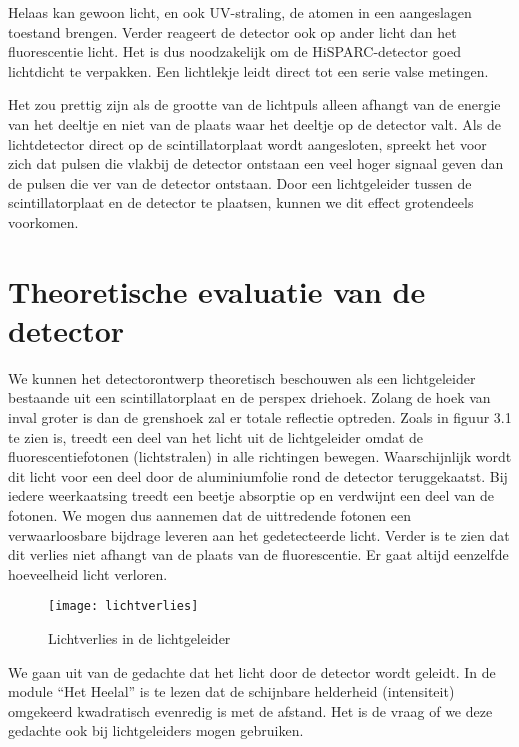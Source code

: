Helaas kan gewoon licht, en ook UV-straling, de atomen in een aangeslagen
toestand brengen. Verder reageert de detector ook op ander licht dan
het fluorescentie licht. Het is dus noodzakelijk om de HiSPARC-detector
goed lichtdicht te verpakken. Een lichtlekje leidt direct tot een
serie valse metingen.

Het zou prettig zijn als de grootte van de lichtpuls alleen afhangt
van de energie van het deeltje en niet van de plaats waar het deeltje
op de detector valt. Als de lichtdetector direct op de scintillatorplaat
wordt aangesloten, spreekt het voor zich dat pulsen die vlakbij de
detector ontstaan een veel hoger signaal geven dan de pulsen die ver
van de detector ontstaan. Door een lichtgeleider tussen de scintillatorplaat
en de detector te plaatsen, kunnen we dit effect grotendeels voorkomen.


\section{Theoretische evaluatie van de detector}

We kunnen het detectorontwerp theoretisch beschouwen als een lichtgeleider
bestaande uit een scintillatorplaat en de perspex driehoek. Zolang
de hoek van inval groter is dan de grenshoek zal er totale reflectie
optreden. Zoals in figuur 3.1 te zien is, treedt een deel van het
licht uit de lichtgeleider omdat de fluorescentiefotonen (lichtstralen)
in alle richtingen bewegen. Waarschijnlijk wordt dit licht voor een
deel door de aluminiumfolie rond de detector teruggekaatst. Bij iedere
weerkaatsing treedt een beetje absorptie op en verdwijnt een deel
van de fotonen. We mogen dus aannemen dat de uittredende fotonen een
verwaarloosbare bijdrage leveren aan het gedetecteerde licht. Verder
is te zien dat dit verlies niet afhangt van de plaats van de fluorescentie.
Er gaat altijd eenzelfde hoeveelheid licht verloren.

\begin{figure}[h]
\noindent \begin{centering}
\texttt{[image: lichtverlies]}
\par\end{centering}

\caption{Lichtverlies in de lichtgeleider}
\end{figure}


We gaan uit van de gedachte dat het licht door de detector wordt geleidt.
In de module ``Het Heelal'' is te lezen dat de schijnbare helderheid
(intensiteit) omgekeerd kwadratisch evenredig is met de afstand. Het
is de vraag of we deze gedachte ook bij lichtgeleiders mogen gebruiken.


